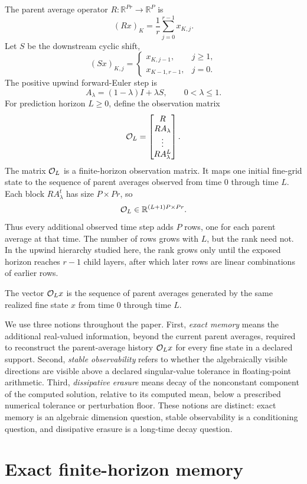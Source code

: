 \documentclass[pdflatex,sn-mathphys-num]{sn-jnl}%
\newcommand{\R}{\mathbb R}
\theoremstyle{thmstyleone}%
\theoremstyle{thmstyletwo}%
\theoremstyle{thmstylethree}%
\begin{document}
The parent average operator \(R:\R^{Pr}\to\R^P\) is
\[
  (Rx)_K=\frac1r\sum_{j=0}^{r-1}x_{K,j}.
\]
Let \(S\) be the downstream cyclic shift,
\[
 (Sx)_{K,j}
 =
 \begin{cases}
   x_{K,j-1}, & j\ge1,\\
   x_{K-1,r-1}, & j=0.
 \end{cases}
\]
The positive upwind forward-Euler step is
\[
  A_\lambda=(1-\lambda)I+\lambda S,
  \qquad
  0<\lambda\le1.
\]
For prediction horizon \(L\ge0\), define the observation matrix
\[
  {\cal O}_L =
  \begin{bmatrix}
  R\\
  RA_\lambda\\
  \vdots\\
  RA_\lambda^L
  \end{bmatrix}.
\]
The matrix \({\cal O}_L\) is a finite-horizon observation matrix.  It maps
one initial fine-grid state to the sequence of parent averages observed from
time \(0\) through time \(L\).  Each block \(RA_\lambda^t\) has size
\(P\times Pr\), so
\[
  {\cal O}_L\in\mathbb R^{(L+1)P\times Pr}.
\]
Thus every additional observed time step adds \(P\) rows, one for each
parent average at that time.  The number of rows grows with \(L\), but the
rank need not.  In the upwind hierarchy studied here, the rank grows only
until the exposed horizon reaches \(r-1\) child layers, after which later
rows are linear combinations of earlier rows.

The vector \({\cal O}_Lx\) is the sequence of parent averages generated by
the same realized fine state \(x\) from time \(0\) through time \(L\).

We use three notions throughout the paper.  First, \emph{exact memory}
means the additional real-valued information, beyond the current parent
averages, required to reconstruct the parent-average history
\({\cal O}_Lx\) for every fine state in a declared support.  Second,
\emph{stable observability} refers to whether the algebraically visible
directions are visible above a declared singular-value tolerance in
floating-point arithmetic.  Third, \emph{dissipative erasure} means decay of
the nonconstant component of the computed solution, relative to its computed
mean, below a prescribed numerical tolerance or perturbation floor.  These
notions are distinct: exact memory is an algebraic dimension question,
stable observability is a conditioning question, and dissipative erasure is
a long-time decay question.

\section{Exact finite-horizon memory} \label{sec:exact_fh}
\end{document}
